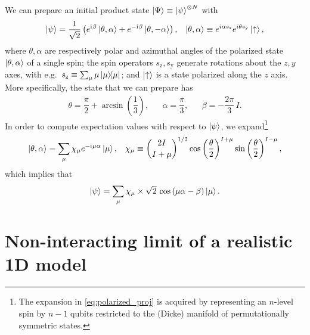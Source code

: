 \documentclass[nofootinbib,notitlepage,11pt]{revtex4-2}
\newcommand{\f}[2]{\dfrac{#1}{#2}} %
\newcommand{\p}[1]{\left(#1\right)} %
\renewcommand{\i}{\mathrm{i}\mkern1mu} %
\newcommand{\1}{\mathds{1}}
\newcommand{\up}{\uparrow}
\newcommand{\y}{\text{y}}
\newcommand{\z}{\text{z}}
\begin{document}
We can prepare an initial product state
$\ket\Psi\equiv\ket\psi^{\otimes N}$ with
\begin{align}
  \ket\psi = \f1{\sqrt{2}}
  \p{e^{\i\beta} \ket{\theta,\alpha}
    + e^{-\i\beta} \ket{\theta,-\alpha}},
  &&
  \ket{\theta,\alpha} \equiv e^{i\alpha s_\z} e^{i\theta s_\y} \ket\up,
  \label{eq:double_state}
\end{align}
where $\theta,\alpha$ are respectively polar and azimuthal angles of
the polarized state $\ket{\theta,\alpha}$ of a single spin; the spin
operators $s_\z,s_\y$ generate rotations about the $z,y$ axes, with
e.g.~$s_\z\equiv\sum_\mu \mu\op\mu$; and $\ket\up$ is a state
polarized along the $z$ axis.  More specifically, the state that we
can prepare has
\begin{align}
  \theta = \f{\pi}{2} + \arcsin\p{\f13},
  &&
  \alpha = \f{\pi}{3},
  &&
  \beta = -\f{2\pi}{3}\, I.
\end{align}
In order to compute expectation values with respect to $\ket\psi$, we
expand\footnote{The expansion in \eqref{eq:polarized_proj} is acquired
  by representing an $n$-level spin by $n-1$ qubits restricted to the
  (Dicke) manifold of permutationally symmetric states.}
\begin{align}
  \ket{\theta,\alpha} = \sum_\mu \chi_\mu e^{-\i\mu\alpha} \ket\mu,
  &&
  \chi_\mu \equiv { 2I \choose I+\mu }^{1/2}
  \cos\p{\f{\theta}{2}}^{I+\mu} \sin\p{\f{\theta}{2}}^{I-\mu},
  \label{eq:polarized_proj}
\end{align}
which implies that
\begin{align}
  \ket\psi = \sum_\mu \chi_\mu \times \sqrt{2}\,
  \cos\p{\mu\alpha-\beta} \ket\mu.
\end{align}

\section{Non-interacting limit of a realistic 1D model}
\end{document}
